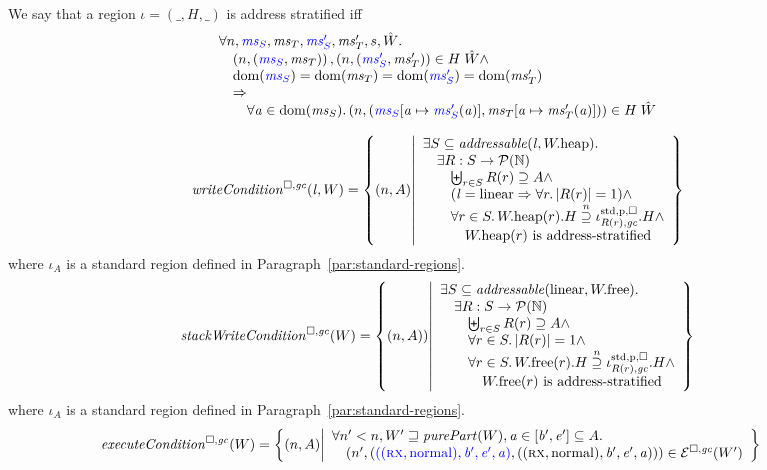 \begin{definition}
  \label{def:address-stratified}
  We say that a region $\iota = (\_,H,\_)$ is address stratified iff
  \[
    \begin{array}{l}
      \forall n, \src{\ms_S},\ms_T,\src{\ms_S'},\ms_T',s,\hat{W}\ldotp \\
      \quad \npair{\stpair{\ms}{\ms}}, \npair{\stpair[.]{\ms_S'}{\ms_T'}} \in H \; \hat{W} \wedge \\
      \quad \dom(\src{\ms_S}) = \dom(\ms_T) = \dom(\src{\ms_S'}) = \dom(\ms_T') \\
      \quad \Rightarrow \\
      \qquad \forall \aaddr \in \dom(\ms_S) \ldotp \npair{(\src{\ms_S}\update{\aaddr}{\src{\ms_S'}(\aaddr)},\ms_T\update{\aaddr}{\ms_T'(\aaddr)})} \in H \; \hat{W}
    \end{array}
  \]
\end{definition}
\[
  \writeCond{\lin,W} = \left\{ \npair{A} \middle| 
    \begin{array}{l}
      \exists S \subseteq \addressable{\lin, \pwheap} \ldotp \\
      \quad \exists R : S \fun \powerset{\nats} \\
      \qquad \biguplus_{r\in S} R(r) \supseteq A \wedge\\
      \qquad (\lin = \linear \Rightarrow \forall r\ldotp |R(r)|  = 1) \wedge\\
      \qquad \forall r \in S \ldotp \pwheap(r).H \nsupeq \stdreg{R(r),\gc}{\pur}.H \wedge\\
      \qquad \quad \pwheap(r) \text{ is address-stratified}
    \end{array}
  \right\}
\]
where $\iota_A$ is a standard region defined in Paragraph~\ref{par:standard-regions}.
\[
  \stackWriteCond{W} = \left\{ \npair{A}) \middle| 
    \begin{array}{l}
      \exists S \subseteq \addressable{\linear, \pwfree} \ldotp \\
      \quad \exists R : S \fun \powerset{\nats} \\
      \qquad \biguplus_{r\in S} R(r) \supseteq A \wedge \\
      \qquad \forall r \in S \ldotp |R(r)| = 1 \wedge \\
      \qquad \forall r \in S \ldotp \pwfree(r).H \nsupeq \stdreg{R(r),\gc}{\pur}.H \wedge\\
      \qquad \quad \pwfree(r) \text{ is address-stratified}
    \end{array}
  \right\}
\]
where $\iota_A$ is a standard region defined in Paragraph~\ref{par:standard-regions}.
\begin{align*}
  \execCond{W} &=
  \left\{ \npair{A} \middle|
    \begin{array}{l}
      \forall n' < n, W' \future \purePart{W}, \aaddr \in [\baddr',\eaddr'] \subseteq A \ldotp\\
      \quad \npair[n']{\stpair[.]{((\rx,\normal),\baddr',\eaddr',\aaddr)}{((\rx,\normal),\baddr',\eaddr',\aaddr)}} \in \lre(W')
    \end{array}
    \right\}
\end{align*}

